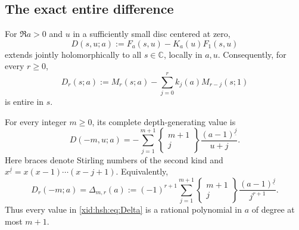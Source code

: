 \subsection{The exact entire difference}

\begin{theorem}
\label{xid:hsh:thm:entire}
For $\Re a>0$ and $u$ in a sufficiently small disc centered at zero,
\begin{equation}\label{xid:hsh:eq:D}
 D(s,u;a):=F_a(s,u)-K_a(u)F_1(s,u)
\end{equation}
extends jointly holomorphically to all $s\in\mathbb C$, locally in $a,u$.
Consequently, for every $r\ge0$,
\begin{equation}\label{xid:hsh:eq:Dr}
 D_r(s;a):=M_r(s;a)-\sum_{j=0}^rk_j(a)M_{r-j}(s;1)
\end{equation}
is entire in $s$.

For every integer $m\ge0$, its complete depth-generating value is
\begin{equation}\label{xid:hsh:eq:T}
 \boxed{\quad D(-m,u;a)
 =-\sum_{j=1}^{m+1}
       {\left\{\begin{matrix}m+1\\j\end{matrix}\right\}}
       \frac{(a-1)^{\underline j}}{u+j}.\quad}
\end{equation}
Here braces denote Stirling numbers of the second kind and
$x^{\underline j}=x(x-1)\cdots(x-j+1)$.
Equivalently,
\begin{equation}\label{xid:hsh:eq:Delta}
 \boxed{\quad
 D_r(-m;a)=\Delta_{m,r}(a):=
 (-1)^{r+1}\sum_{j=1}^{m+1}
       {\left\{\begin{matrix}m+1\\j\end{matrix}\right\}}
       \frac{(a-1)^{\underline j}}{j^{r+1}}.
 \quad}
\end{equation}
Thus every value in \eqref{xid:hsh:eq:Delta} is a rational polynomial in $a$
of degree at most $m+1$.
\end{theorem}

